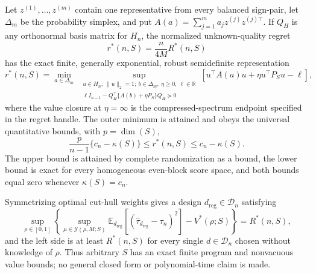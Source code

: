 Let \(z^{(1)},\ldots,z^{(m)}\) contain one representative from every balanced sign-pair, let \(\Delta_m\) be the probability simplex, and put \(A(a)=\sum_{j=1}^m a_jz^{(j)}z^{(j)\top}\).  If \(Q_H\) is any orthonormal basis matrix for \(H_n\), the normalized unknown-quality regret
\[
r^*(n,S)=\frac{n}{4M}R^*(n,S)
\]
has the exact finite, generally exponential, robust semidefinite representation
\[
r^*(n,S)
=\min_{a\in\Delta_m}\ \sup_{\substack{u\in H_n,\ \|u\|_2=1;\ b\in\Delta_m,\ \eta\geq0,\ \ell\in\mathbb R\\
\ell I_{n-1}-Q_H^\top\{A(b)+\eta P_S\}Q_H\succeq0}}
\left[u^\top A(a)u+\eta u^\top P_Su-\ell\right],
\]
where the value closure at \(\eta=\infty\) is the compressed-spectrum endpoint specified in the regret handle.  The outer minimum is attained and obeys the universal quantitative bounds, with \(p=\dim(S)\),
\[
\frac{p}{n-1}\{c_n-\kappa(S)\}
\leq r^*(n,S)
\leq c_n-\kappa(S).
\]
The upper bound is attained by complete randomization as a bound, the lower bound is exact for every homogeneous even-block score space, and both bounds equal zero whenever \(\kappa(S)=c_n\).

Symmetrizing optimal cut-hull weights gives a design \(d_{\mathrm{reg}}\in\mathcal D_n\) satisfying
\[
\sup_{\rho\in[0,1]}
\left\{
\sup_{\mu\in\mathcal Y(\rho,M;S)}
\mathbb E_{d_{\mathrm{reg}}}[(\widehat\tau_{d_{\mathrm{reg}}}-\tau_n)^2]
-V^*(\rho;S)
\right\}=R^*(n,S),
\]
and the left side is at least \(R^*(n,S)\) for every single \(d\in\mathcal D_n\) chosen without knowledge of \(\rho\).  Thus arbitrary \(S\) has an exact finite program and nonvacuous value bounds; no general closed form or polynomial-time claim is made.